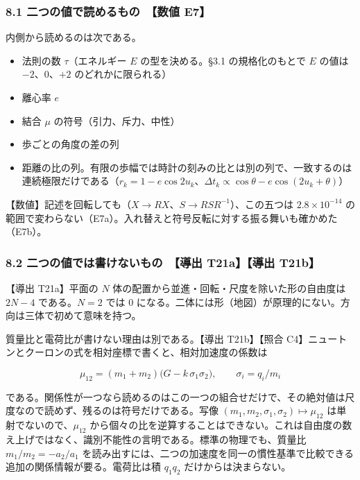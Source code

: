 \documentclass[
  a4paper,
]{ltjsarticle}
\providecommand{\tightlist}{%
  \setlength{\itemsep}{0pt}\setlength{\parskip}{0pt}}
\begin{document}
\subsubsection{8.1 二つの値で読めるもの　【数値
E7】}\label{ux4e8cux3064ux306eux5024ux3067ux8aadux3081ux308bux3082ux306e-ux6570ux5024-e7}

内側から読めるのは次である。

\begin{itemize}
\tightlist
\item
  法則の数 \(\tau\)（エネルギー \(E\) の型を決める。§3.1
  の規格化のもとで \(E\) の値は \(-2\)、\(0\)、\(+2\)
  のどれかに限られる）
\item
  離心率 \(e\)
\item
  結合 \(\mu\) の符号（引力、斥力、中性）
\item
  歩ごとの角度の差の列
\item
  距離の比の列。有限の歩幅では時計の刻みの比とは別の列で、一致するのは連続極限だけである（\(r_k=1-e\cos2u_k\)、\(\Delta t_k\propto\cos\theta-e\cos(2u_k+\theta)\)）
\end{itemize}

【数値】記述を回転しても（\(X\to RX\)、\(S\to RSR^{-1}\)）、この五つは
\(2.8\times10^{-14}\)
の範囲で変わらない（E7a）。入れ替えと符号反転に対する振る舞いも確かめた（E7b）。

\subsubsection{8.2 二つの値では書けないもの　【導出 T21a】【導出
T21b】}\label{ux4e8cux3064ux306eux5024ux3067ux306fux66f8ux3051ux306aux3044ux3082ux306e-ux5c0eux51fa-t21aux5c0eux51fa-t21b}

【導出 T21a】平面の \(N\)
体の配置から並進・回転・尺度を除いた形の自由度は \(2N-4\)
である。\(N=2\) では 0
になる。二体には形（地図）が原理的にない。方向は三体で初めて意味を持つ。

質量比と電荷比が書けない理由は別である。【導出 T21b】【照合
C4】ニュートンとクーロンの式を相対座標で書くと、相対加速度の係数は

\[
\mu_{12}=(m_1+m_2)\bigl(G-k\,\sigma_1\sigma_2\bigr),\qquad \sigma_i=q_i/m_i
\]

である。関係性が一つなら読めるのはこの一つの組合せだけで、その絶対値は尺度なので読めず、残るのは符号だけである。写像
\((m_1,m_2,\sigma_1,\sigma_2)\mapsto\mu_{12}\)
は単射でないので、\(\mu_{12}\)
から個々の比を逆算することはできない。これは自由度の数え上げではなく、識別不能性の言明である。標準の物理でも、質量比
\(m_1/m_2=-a_2/a_1\)
を読み出すには、二つの加速度を同一の慣性基準で比較できる追加の関係情報が要る。電荷比は積
\(q_1q_2\) だけからは決まらない。
\end{document}
